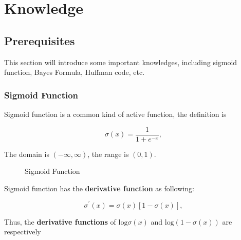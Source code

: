 \chapter{Knowledge}
\label{cha:knowledgei}

\section{Prerequisites}

This section will introduce some important knowledges, including sigmoid function, Bayes Formula, Huffman code, etc.

\subsection{Sigmoid Function}

Sigmoid function is a common kind of active function, the definition is

$$ \sigma(x) = \frac{1}{1+e^{-x}}, $$

The domain is $(-\infty, \infty)$, the range is $(0,1)$.

\begin{figure}[H]
\centering
\begin{minipage}{.4\textwidth}
  \centering
	\caption{Sigmoid Function}
	\label{fig:sigmoid}
\end{minipage}
\end{figure}

Sigmoid function has the \textbf{derivative function} as following:

$$ \sigma^\prime(x) = \sigma(x)[1-\sigma(x)], $$

Thus, the \textbf{derivative functions} of $\mathrm{log}\sigma(x)$ and $\mathrm{log}(1-\sigma(x))$ are respectively

